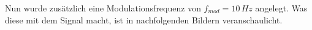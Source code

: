 \documentclass{scrartcl}						%
\begin{document}
			Nun wurde zusätzlich eine Modulationsfrequenz von $ f_{mod}=10\,Hz$ angelegt.  Was diese mit dem Signal macht, ist in nachfolgenden Bildern veranschaulicht.
			\begin{figure}[h!]
				\centering
			\end{figure}
\end{document}
